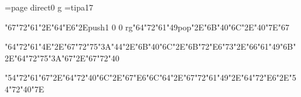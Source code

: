 \chardef\match=\pdfcolorstackinit page direct{0 g} \font\ipa=tipa17 \pdfpagewidth 5.5in \pdfpageheight 8.5in \hsize 4.5in \vsize 7.25in \hoffset -0.5in \voffset -0.75in
\null\vfill
\centerline{\ipa\char"67\ipa\char"72\ipa\char"61\ipa\char"2E\ipa\char"64\ipa\char"E6\ipa\char"2E\pdfcolorstack\match push{1 0 0 rg}\ipa\char"64\ipa\char"72\ipa\char"61\ipa\char"49\pdfcolorstack\match pop{}\ipa\char"2E\ipa\char"6B\ipa\char"40\ipa\char"6C\ipa\char"2E\ipa\char"40\ipa\char"7E\ipa\char"67}\bigskip
\centerline{\ipa\char"64\ipa\char"72\ipa\char"61\ipa\char"4E\ipa\char"2E\ipa\char"67\ipa\char"72\ipa\char"75\ipa\char"3A\ipa\char"44\ipa\char"2E\ipa\char"6B\ipa\char"40\ipa\char"6C\ipa\char"2E\ipa\char"6B\ipa\char"72\ipa\char"E6\ipa\char"73\ipa\char"2E\ipa\char"66\ipa\char"61\ipa\char"49\ipa\char"6B\ipa\char"2E\ipa\char"64\ipa\char"72\ipa\char"75\ipa\char"3A\ipa\char"67\ipa\char"2E\ipa\char"67\ipa\char"72\ipa\char"40}\bigskip
\centerline{\ipa\char"54\ipa\char"72\ipa\char"61\ipa\char"67\ipa\char"2E\ipa\char"64\ipa\char"72\ipa\char"40\ipa\char"6C\ipa\char"2E\ipa\char"67\ipa\char"E6\ipa\char"6C\ipa\char"64\ipa\char"2E\ipa\char"67\ipa\char"72\ipa\char"61\ipa\char"49\ipa\char"2E\ipa\char"64\ipa\char"72\ipa\char"E6\ipa\char"2E\ipa\char"54\ipa\char"72\ipa\char"40\ipa\char"7E}\bye